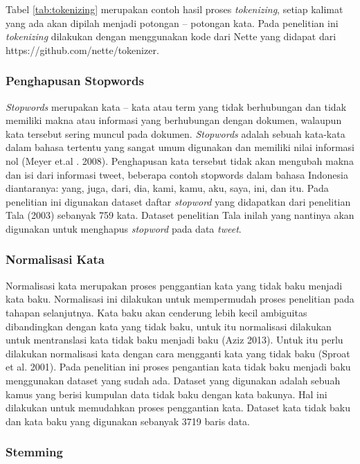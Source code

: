 Tabel \ref{tab:tokenizing} merupakan contoh hasil proses \textit{tokenizing}, setiap kalimat yang ada akan dipilah menjadi potongan – potongan kata. Pada penelitian ini \textit{tokenizing} dilakukan dengan menggunakan kode dari Nette yang didapat dari https://github.com/nette/tokenizer.


\subsubsection*{Penghapusan Stopwords}

\textit{Stopwords} merupakan kata – kata atau term yang tidak berhubungan dan tidak memiliki makna atau informasi yang berhubungan dengan dokumen, walaupun kata tersebut sering muncul pada dokumen. \textit{Stopwords} adalah sebuah kata-kata dalam bahasa tertentu yang sangat umum digunakan dan memiliki nilai informasi nol (Meyer et.al . 2008). Penghapusan kata tersebut tidak akan mengubah makna dan isi dari informasi tweet, beberapa contoh stopwords dalam bahasa  Indonesia diantaranya: yang, juga, dari, dia, kami, kamu, aku, saya, ini, dan itu. Pada penelitian ini digunakan dataset daftar \textit{stopword} yang  didapatkan dari penelitian Tala (2003) sebanyak 759 kata. Dataset penelitian Tala inilah yang nantinya akan digunakan untuk menghapus \textit{stopword} pada data \textit{tweet}.


\subsubsection*{Normalisasi Kata}

Normalisasi kata merupakan proses penggantian kata yang tidak baku menjadi kata baku. Normalisasi ini dilakukan untuk mempermudah proses penelitian pada tahapan selanjutnya. Kata baku akan cenderung lebih kecil ambiguitas dibandingkan dengan kata yang tidak baku, untuk itu normalisasi dilakukan untuk mentranslasi kata tidak baku menjadi baku (Aziz 2013). Untuk itu perlu dilakukan normalisasi kata dengan cara mengganti kata yang tidak baku (Sproat et al. 2001). Pada penelitian ini proses pengantian kata tidak baku menjadi baku menggunakan dataset yang sudah ada. Dataset yang digunakan adalah sebuah kamus yang berisi kumpulan data tidak baku dengan kata bakunya. Hal ini dilakukan untuk memudahkan proses penggantian kata. Dataset kata tidak baku dan kata baku yang digunakan sebanyak 3719 baris data. 

\subsubsection*{Stemming}

